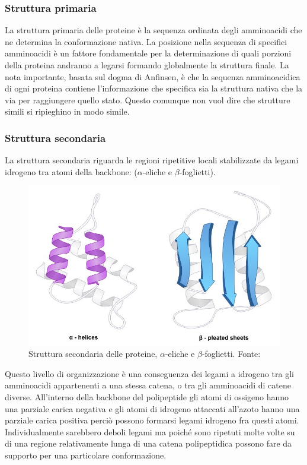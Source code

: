 \subsubsection{Struttura primaria}
La struttura primaria delle proteine è la sequenza ordinata degli amminoacidi che ne determina la conformazione nativa. La posizione nella sequenza di specifici amminoacidi è un fattore fondamentale per la determinazione di quali porzioni della proteina andranno a legarsi formando globalmente la struttura finale. La nota importante, basata sul dogma di Anfinsen, è che la sequenza amminoacidica di ogni proteina contiene l'informazione che specifica sia la struttura nativa che la via per raggiungere quello stato. Questo comunque non vuol dire che strutture simili si ripieghino in modo simile.
	
\subsubsection{Struttura secondaria}

La struttura secondaria riguarda le regioni ripetitive locali stabilizzate da legami idrogeno tra atomi della backbone: ($\alpha$-eliche e $\beta$-foglietti).

\begin{figure}[h]
	\centering
	\includegraphics[scale=0.4]{images/secondary.jpeg}
	\caption{Struttura secondaria delle proteine, $\alpha$-eliche e $\beta$-foglietti. Fonte: \cite{proteinStrucBioNinja}}
	\label{fig:struttura-secondaria}
\end{figure}

Questo livello di organizzazione è una conseguenza dei legami a idrogeno tra gli amminoacidi appartenenti a una stessa catena, o tra gli amminoacidi di catene diverse.  All'interno della backbone del polipeptide gli atomi di ossigeno hanno una parziale carica negativa e gli atomi di idrogeno attaccati all'azoto hanno una parziale carica positiva perciò possono formarsi legami idrogeno fra questi atomi. Individualmente sarebbero deboli legami ma poiché sono ripetuti molte volte su di una regione relativamente lunga di una catena polipeptidica possono fare da supporto per una particolare conformazione.

